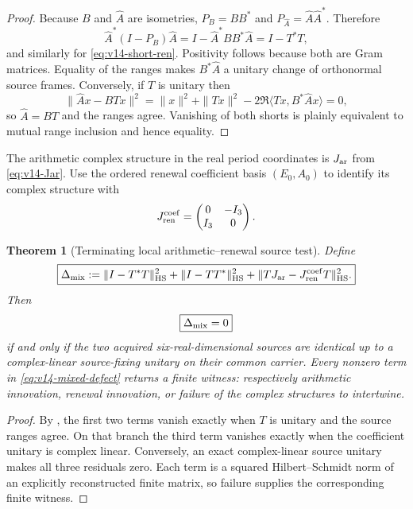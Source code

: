 \documentclass[11pt]{article}
\newtheorem{theorem}{Theorem}[section]
\theoremstyle{definition}
\theoremstyle{remark}
\newcommand{\HS}{\mathrm{HS}}
\begin{document}
\begin{proof}
Because $B$ and $\widehat A$ are isometries,
$P_B=BB^*$ and $P_{\widehat A}=\widehat A\widehat A^*$.  Therefore
\[
 \widehat A^*(I-P_B)\widehat A
 =I-\widehat A^*BB^*\widehat A=I-T^*T,
\]
and similarly for \eqref{eq:v14-short-ren}.  Positivity follows because both
are Gram matrices.  Equality of the ranges makes $B^*\widehat A$ a unitary
change of orthonormal source frames.  Conversely, if $T$ is unitary then
\[
 \|\widehat Ax-BTx\|^2
 =\|x\|^2+\|Tx\|^2-2\Re\langle Tx,B^*\widehat Ax\rangle=0,
\]
so $\widehat A=BT$ and the ranges agree.  Vanishing of both shorts is plainly
equivalent to mutual range inclusion and hence equality.
\end{proof}

The arithmetic complex structure in the real period coordinates is
$J_{\rm ar}$ from \eqref{eq:v14-Jar}.  Use the ordered renewal coefficient
basis $(E_0,A_0)$ to identify its complex structure with
\[
 J_{\rm ren}^{\rm coef}
 =\begin{pmatrix}0&-I_3\\I_3&0\end{pmatrix}.
\]

\begin{theorem}[Terminating local arithmetic--renewal source test]
\label{thm:v14-terminating-test}
Define
\begin{equation}
 \boxed{
 \Delta_{\rm mix}:=
 \|I-T^*T\|_{\HS}^2
 +\|I-TT^*\|_{\HS}^2
 +\|TJ_{\rm ar}-J_{\rm ren}^{\rm coef}T\|_{\HS}^2.}
 \label{eq:v14-mixed-defect}
\end{equation}
Then
\[
 \boxed{\Delta_{\rm mix}=0}
\]
if and only if the two acquired six-real-dimensional sources are identical up
to a complex-linear source-fixing unitary on their common carrier.
Every nonzero term in \eqref{eq:v14-mixed-defect} returns a finite witness:
respectively arithmetic innovation, renewal innovation, or failure of the
complex structures to intertwine.
\end{theorem}

\begin{proof}
By , the first two terms vanish exactly when
$T$ is unitary and the source ranges agree.  On that branch the third term
vanishes exactly when the coefficient unitary is complex linear.  Conversely,
an exact complex-linear source unitary makes all three residuals zero.  Each
term is a squared Hilbert--Schmidt norm of an explicitly reconstructed finite
matrix, so failure supplies the corresponding finite witness.
\end{proof}
\end{document}
